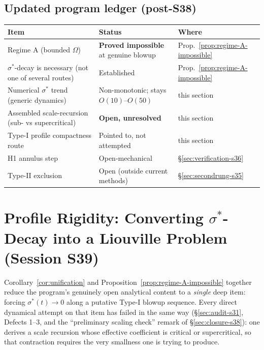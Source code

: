 \documentclass[11pt]{article}
\theoremstyle{definition}
\theoremstyle{remark}
\begin{document}
\subsection{Updated program ledger (post-S38)}

\begin{center}
\begin{tabular}{lll}
\hline
Item & Status & Where \\
\hline
Regime A (bounded $\Omega$) & \textbf{Proved impossible} at genuine blowup & Prop.~\ref{prop:regime-A-impossible} \\
$\sigma^*$-decay is necessary (not one of several routes) & Established & Prop.~\ref{prop:regime-A-impossible} \\
Numerical $\sigma^*$ trend (generic dynamics) & Non-monotonic; stays $O(10)$--$O(50)$ & this section \\
Assembled scale-recursion (sub- vs supercritical) & \textbf{Open, unresolved} & this section \\
Type-I profile compactness route & Pointed to, not attempted & this section \\
H1 annulus step & Open-mechanical & \S\ref{sec:verification-s36} \\
Type-II exclusion & Open (outside current methods) & \S\ref{sec:secondrung-s35} \\
\hline
\end{tabular}
\end{center}

\section{Profile Rigidity: Converting $\sigma^*$-Decay into a Liouville Problem (Session S39)}
\label{sec:rigidity-s39}

Corollary~\ref{cor:unification} and Proposition~\ref{prop:regime-A-impossible}
together reduce the program's genuinely open analytical content to a
\emph{single} deep item: forcing $\sigma^*(t)\to 0$ along a putative Type-I
blowup sequence. Every direct dynamical attempt on that item has failed in the
same way (\S\ref{sec:audit-s31}, Defects 1--3, and the ``preliminary scaling
check'' remark of \S\ref{sec:closure-s38}): one derives a scale recursion whose
effective coefficient is critical or supercritical, so that contraction
requires the very smallness one is trying to produce.
\end{document}
